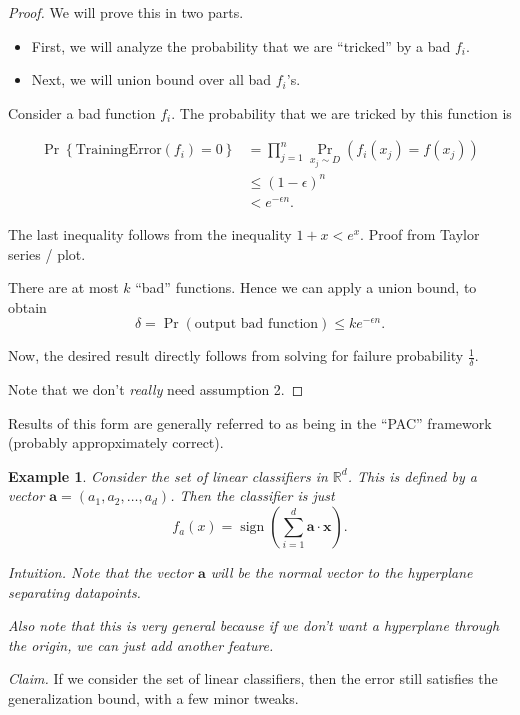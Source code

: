 \documentclass[12pt]{article}
\newtheorem*{example}{Example}
\newcommand{\RR}{\mathbb{R}}
\newcommand{\eps}{\epsilon}
\newcommand{\mbf}{\mathbf}
\DeclareMathOperator{\sign}{sign}
\begin{document}
\begin{proof}
  We will prove this in two parts.
  \begin{itemize}
    \item First, we will analyze the probability that we are ``tricked'' by a bad $f_i$.
    \item Next, we will union bound over all bad $f_i$'s.
  \end{itemize}

  Consider a bad function $f_i$.  The probability that we are tricked by this function is 

  \begin{align*}
   \Pr\left\{ \text{TrainingError}(f_i) = 0 \right\} &= \prod_{j=1}^{n} \Pr_{x_j \sim D} (f_i(x_j) = f(x_j)) \\
   & \leq (1-\eps)^{n} \\
   & < e^{- \eps n}.
  \end{align*}

  The last inequality follows from the inequality $1 + x < e^{x}$.  Proof from Taylor series / plot.

  There are at most $k$ ``bad'' functions.  Hence we can apply a union bound, to obtain
  \[
    \delta = \Pr(\text{output bad function}) \leq k e^{-\eps n}.
  \]

  Now, the desired result directly follows from solving for failure probability $\frac{1}{\delta}$.

  Note that we don't {\it really} need assumption 2.
\end{proof}

Results of this form are generally referred to as being in the ``PAC'' framework (probably appropximately correct).

\begin{example}
  Consider the set of linear classifiers in $\RR^d$.  This is defined by a vector $\mbf{a} = (a_1, a_2, \dots, a_d)$.  Then the classifier is just
  \[
    f_a(x) = \sign\left (\sum_{i=1}^{d} \mbf{a} \cdot \mbf{x} \right ).
  \]

  {\it Intuition.} Note that the vector $\mbf{a}$ will be the normal vector to the hyperplane separating datapoints.

  Also note that this is very general because if we don't want a hyperplane through the origin, we can just add another feature.
\end{example}

{\it Claim.} If we consider the set of linear classifiers, then the error still satisfies the generalization bound, with a few minor tweaks. \\
\end{document}
